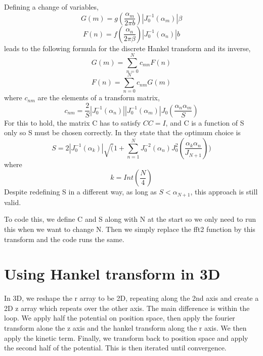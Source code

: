 \documentclass[10pt]{article}
\begin{document}
\begin{multicols}{2}
Defining a change of variables, 
\begin{equation}
G(m) = g(\frac{\alpha_{m}}{2\pi b})|J_{0}^{-1}(\alpha_{m})|\beta
\end{equation}
\begin{equation}
F(n) = f(\frac{\alpha_{n}}{2\pi \beta})|J_{0}^{-1}(\alpha_{n})|b
\end{equation}
leads to the following formula for the discrete Hankel transform and its inverse,
\begin{equation}
G(m) = \sum_{n=0}^{N}c_{mn}F(n)
\end{equation}
\begin{equation}
F(n) =  \sum_{n=0}^{N}c_{nm}G(m)
\end{equation}
where $c_{nm}$ are the elements of a transform matrix, 
\begin{equation}
c_{nm} = \frac{2}{S}|J_{0}^{-1}(\alpha_{n})||J_{0}^{-1}(\alpha_{m})|J_{0}(\frac{\alpha_{n}\alpha_{m}}{S})
\end{equation}
For this to hold, the matrix C has to satisfy $CC =I$, and C is a function of S only so S must be chosen correctly. In \cite{Kai_Ming_2009} they state that the optimum choice is 
\begin{equation}
S = 2|J_{0}^{-1}(\alpha_{k})|\sqrt(1+\sum_{n=1}^{N}J_{0}^{-2}(\alpha_{n})J_{0}^{2}(\frac{\alpha_{k}\alpha_{n}}{J_{N+1}}))
\end{equation}
where 
\begin{equation}
k = Int(\frac{N}{4})
\end{equation}
Despite redefining S in a different way, as long as $S<\alpha_{N+1}$, this approach is still valid.


 To code this, we  define C and S along with N at the start so we only need to run this when we want to change N. Then we simply replace the fft2 function by this transform and the code runs the same.
\section{Using Hankel transform in 3D}

In 3D, we reshape the r array to be 2D, repeating along the 2nd axis and create a 2D z array which repeats over the other axis. The main difference is within the loop. We apply half the potential on position space, then apply the fourier transform alone the z axis and the hankel transform along the r axis. We then apply the kinetic term. Finally, we transform back to position space and apply the second half of the potential. This is then iterated until convergence. 


\end{multicols}
\end{document}
